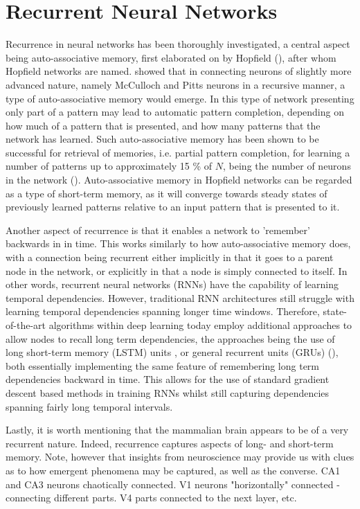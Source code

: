 \section{Recurrent Neural Networks}

Recurrence in neural networks has been thoroughly investigated, a central aspect being auto-associative memory, first elaborated on by Hopfield (\cite{Hopfield1982}), after whom Hopfield networks are named. \cite{Hopfield1982} showed that in connecting neurons of slightly more advanced nature, namely McCulloch and Pitts neurons in a recursive manner, a type of auto-associative memory would emerge. In this type of network presenting only part of a pattern may lead to automatic pattern completion, depending on how much of a pattern that is presented, and how many patterns that the network has learned. Such auto-associative memory has been shown to be successful for retrieval of memories, i.e. partial pattern completion, for learning a number of patterns up to approximately 15 \% of $N$, being the number of neurons in the network (\cite{Hopfield1982}). Auto-associative memory in Hopfield networks can be regarded as a type of short-term memory, as it will converge towards steady states of previously learned patterns relative to an input pattern that is presented to it.

Another aspect of recurrence is that it enables a network to 'remember' backwards in in time. This works similarly to how auto-associative memory does, with a connection being recurrent either implicitly in that it goes to a parent node in the network, or explicitly in that a node is simply connected to itself. In other words, recurrent neural networks (RNNs) have the capability of learning temporal dependencies. However, traditional RNN architectures still struggle with learning temporal dependencies spanning longer time windows. Therefore, state-of-the-art algorithms within deep learning today employ additional approaches to allow nodes to recall long term dependencies, the approaches being the use of long short-term memory (LSTM) units \cite{Hochreiter1997}, or general recurrent units (GRUs) (\cite{Cho2014}), both essentially implementing the same feature of remembering long term dependencies backward in time. This allows for the use of standard gradient descent based methods in training RNNs whilst still capturing dependencies spanning fairly long temporal intervals.

Lastly, it is worth mentioning that the mammalian brain appears to be of a very recurrent nature. Indeed, recurrence captures aspects of long- and short-term memory. Note, however that insights from neuroscience may provide us with clues as to how emergent phenomena may be captured, as well as the converse. CA1 and CA3 neurons chaotically connected. V1 neurons "horizontally" connected - connecting different parts. V4 parts connected to the next layer, etc.

